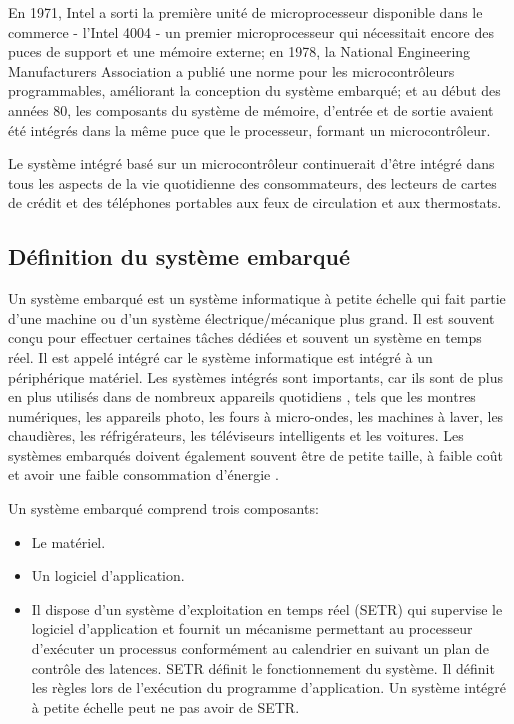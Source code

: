 En 1971, Intel a sorti la première unité de microprocesseur disponible dans le commerce - l'Intel 4004 - un premier microprocesseur qui nécessitait encore des puces de support et une mémoire externe; en 1978, la National Engineering Manufacturers Association a publié une norme pour les microcontrôleurs programmables, améliorant la conception du système embarqué; et au début des années 80, les composants du système de mémoire, d'entrée et de sortie avaient été intégrés dans la même puce que le processeur, formant un microcontrôleur.

Le système intégré basé sur un microcontrôleur continuerait d’être intégré dans tous les aspects de la vie quotidienne des consommateurs, des lecteurs de cartes de crédit et des téléphones portables aux feux de circulation et aux thermostats.
\subsection{Définition du système embarqué}

Un système embarqué est un système informatique à petite échelle qui fait partie d'une machine ou d'un système électrique/mécanique plus grand. Il est souvent conçu pour effectuer certaines tâches dédiées et souvent un système en temps réel. Il est appelé intégré car le système informatique est intégré à un périphérique matériel. Les systèmes intégrés sont importants, car ils sont de plus en plus utilisés dans de nombreux appareils quotidiens \cite{pavithra2015iot}, tels que les montres numériques, les appareils photo, les fours à micro-ondes, les machines à laver, les chaudières, les réfrigérateurs, les téléviseurs intelligents et les voitures. Les systèmes embarqués doivent également souvent être de petite taille, à faible coût et avoir une faible consommation d'énergie \cite{samie2016iot}.

Un système embarqué comprend trois composants:
\begin{itemize}
    \item Le matériel.

  \item Un logiciel d'application.

  \item Il dispose d'un système d'exploitation en temps réel (SETR) qui supervise le logiciel d'application et fournit un mécanisme permettant au processeur d'exécuter un processus conformément au calendrier en suivant un plan de contrôle des latences. SETR définit le fonctionnement du système. Il définit les règles lors de l'exécution du programme d'application. Un système intégré à petite échelle peut ne pas avoir de SETR.


\end{itemize}

